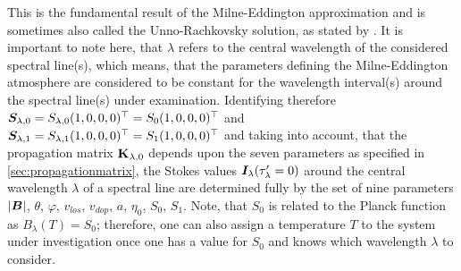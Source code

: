 \documentclass[a4paper,12pt]{report}
\begin{document}
\begin{align}
\begin{aligned}
\end{aligned}
\end{align} This is the fundamental result of the Milne-Eddington approximation and is sometimes also called the Unno-Rachkovsky solution, as stated by \cite[p.160]{delToroIniesta.2003}. It is important to note here, that $\lambda$ refers to the central wavelength of the considered spectral line(s), which means, that the parameters defining the Milne-Eddington atmosphere are considered to be constant for the wavelength interval(s) around the spectral line(s) under examination. Identifying therefore $\bm{S}_{\lambda,0} = S_{\lambda,0}(1,0,0,0)^\top = S_0(1,0,0,0)^\top$ and $\bm{S}_{\lambda,1} = S_{\lambda,1}(1,0,0,0)^\top = S_1(1,0,0,0)^\top$ and taking into account, that the propagation matrix $\boldsymbol{\mathbf{K}}_{\lambda,0}$ depends upon the seven parameters as specified in \cref{sec:propagationmatrix}, the Stokes values $\bm{I}_\lambda(\tau_\lambda^\prime =0)$ around the central wavelength $\lambda$ of a spectral line are determined fully by the set  of nine parameters $|\bm{B}|$, $\theta$, $\varphi$, $v_{los}$, $v_{dop}$, $a$, $\eta_0$,   $S_0$, $S_1$. Note, that $S_0$ is related to the Planck function as $B_\lambda(T) = S_0$; therefore, one can also assign a temperature $T$ to the system under investigation once one has a value for $S_0$ and knows which wavelength $\lambda$ to consider.
\end{document}
